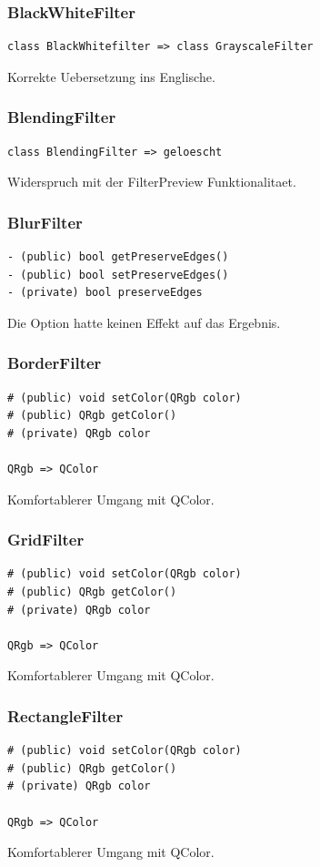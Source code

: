\documentclass[parskip=full]{scrartcl}
\begin{document}
\subsubsection{BlackWhiteFilter}
\begin{verbatim}
class BlackWhitefilter => class GrayscaleFilter
\end{verbatim}
Korrekte Uebersetzung ins Englische.
\subsubsection{BlendingFilter}
\begin{verbatim}
class BlendingFilter => geloescht
\end{verbatim}
Widerspruch mit der FilterPreview Funktionalitaet.
\subsubsection{BlurFilter}
\begin{verbatim}
- (public) bool getPreserveEdges()
- (public) bool setPreserveEdges()
- (private) bool preserveEdges
\end{verbatim}
Die Option hatte keinen Effekt auf das Ergebnis.

\subsubsection{BorderFilter}
\begin{verbatim}
# (public) void setColor(QRgb color)
# (public) QRgb getColor()
# (private) QRgb color

QRgb => QColor
\end{verbatim}
Komfortablerer Umgang mit QColor.

\subsubsection{GridFilter}
\begin{verbatim}
# (public) void setColor(QRgb color)
# (public) QRgb getColor()
# (private) QRgb color

QRgb => QColor
\end{verbatim}
Komfortablerer Umgang mit QColor.
\subsubsection{RectangleFilter}
\begin{verbatim}
# (public) void setColor(QRgb color)
# (public) QRgb getColor()
# (private) QRgb color

QRgb => QColor
\end{verbatim}
Komfortablerer Umgang mit QColor.
\end{document}
